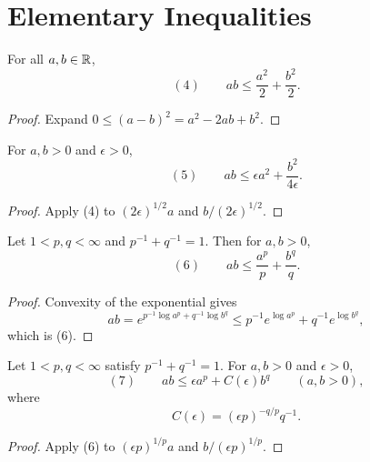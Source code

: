 \section{Elementary Inequalities}
\label{sec:elementary-inequalities}

\begin{lemma}
\label{lem:cauchys-inequality}
For all $a,b\in\mathbb{R}$,
\[
(4)\qquad ab\leq\frac{a^2}{2}+\frac{b^2}{2}.
\]
\end{lemma}
\begin{proof}
\sketch Expand $0\leq(a-b)^2=a^2-2ab+b^2$.
\end{proof}

\begin{lemma}
\label{lem:cauchys-inequality-epsilon}

For $a,b>0$ and $\epsilon>0$,
\[
(5)\qquad
ab\leq\epsilon a^2+\frac{b^2}{4\epsilon}.
\]
\end{lemma}
\begin{proof}
\sketch Apply (4) to $(2\epsilon)^{1/2}a$ and $b/(2\epsilon)^{1/2}$.
\end{proof}

\begin{lemma}
\label{lem:youngs-inequality}

Let $1<p,q<\infty$ and $p^{-1}+q^{-1}=1$. Then for $a,b>0$,
\[
(6)\qquad ab\leq\frac{a^p}{p}+\frac{b^q}{q}.
\]
\end{lemma}
\begin{proof}
\sketch Convexity of the exponential gives
\[
ab=e^{p^{-1}\log a^p+q^{-1}\log b^q}
\leq p^{-1}e^{\log a^p}+q^{-1}e^{\log b^q},
\]
which is (6).
\end{proof}

\begin{lemma}
\label{lem:youngs-inequality-epsilon}

Let $1<p,q<\infty$ satisfy $p^{-1}+q^{-1}=1$. For $a,b>0$ and $\epsilon>0$,
\[
(7)\qquad
ab\leq\epsilon a^p+C(\epsilon)b^q
\qquad(a,b>0),
\]
where
\[
C(\epsilon)=(\epsilon p)^{-q/p}q^{-1}.
\]
\end{lemma}
\begin{proof}
\sketch Apply (6) to $(\epsilon p)^{1/p}a$ and $b/(\epsilon p)^{1/p}$.
\end{proof}

